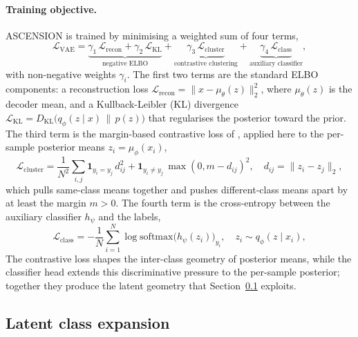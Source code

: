 \paragraph{Training objective.}
ASCENSION is trained by minimising a weighted sum of four terms,
\begin{equation}
\mathcal{L}_{\text{VAE}}
= \underbrace{\gamma_1\,\mathcal{L}_{\text{recon}}
            + \gamma_2\,\mathcal{L}_{\text{KL}}}_{\text{negative ELBO}}
+ \underbrace{\gamma_3\,\mathcal{L}_{\text{cluster}}}_{\text{contrastive clustering}}
+ \underbrace{\gamma_4\,\mathcal{L}_{\text{class}}}_{\text{auxiliary classifier}},
\label{eq:total-loss}
\end{equation}
with non-negative weights $\gamma_i$. The first two terms are
the standard ELBO components: a reconstruction loss
$\mathcal{L}_{\text{recon}} = \|x - \mu_\theta(z)\|_{2}^{2}$, where $\mu_\theta(z)$ is the decoder mean,
and a Kullback-Leibler (KL) divergence
$\mathcal{L}_{\text{KL}} =
D_{\mathrm{KL}}\!\bigl(q_\phi(z\mid x) \,\|\, p(z)\bigr)$ that
regularises the posterior toward the prior. The third term is
the margin-based contrastive loss of \citet{hadsell2006contrastive},
applied here to the per-sample posterior means
$z_i = \mu_\phi(x_i)$,
\begin{equation}
\mathcal{L}_{\text{cluster}}
= \frac{1}{N^{2}} \sum_{i,j}
  \mathbf{1}_{y_i = y_j}\, d_{ij}^{2}
+ \mathbf{1}_{y_i \neq y_j}\, \max(0, m - d_{ij})^{2},
\quad d_{ij} = \|z_i - z_j\|_{2},
\label{eq:cluster}
\end{equation}
which pulls same-class means together and pushes different-class
means apart by at least the margin $m > 0$. The fourth term is
the cross-entropy between the auxiliary classifier $h_\psi$ and
the labels,
\begin{equation}
\mathcal{L}_{\text{class}}
= -\frac{1}{N}\sum_{i=1}^{N}
  \log \mathrm{softmax}\bigl(h_\psi(z_i)\bigr)_{y_i},
\quad z_i \sim q_\phi(z \mid x_i),
\label{eq:class}
\end{equation}
 The
contrastive loss shapes the inter-class geometry of posterior means,
while the classifier head extends this discriminative pressure to
the per-sample posterior; together they produce the latent geometry
that Section~\ref{sec:method:alpha} exploits.

\subsection{Latent class expansion}
\label{sec:method:alpha}

